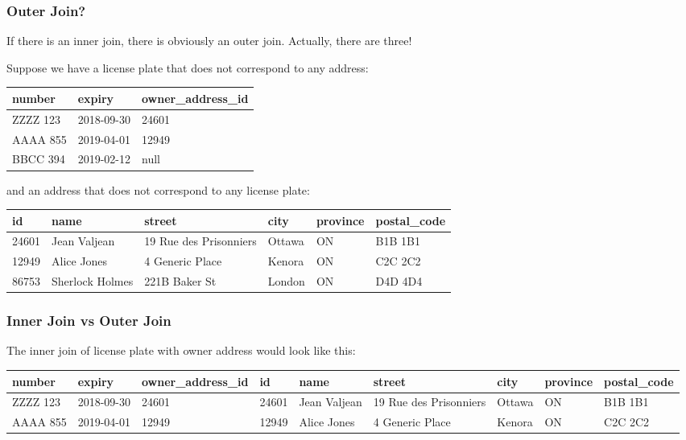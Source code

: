 \begin{frame}
\frametitle{Outer Join?}

If there is an inner join, there is obviously an outer join. Actually, there are three!

Suppose we have a license plate that does not correspond to any address: 

{\scriptsize
\begin{center}
\begin{tabular}{|l|l|l|}\hline
	\textbf{number} & \textbf{expiry} & \textbf{owner\_address\_id} \\ \hline
	ZZZZ 123 & 2018-09-30 & 24601 \\ \hline
	AAAA 855 & 2019-04-01 & 12949 \\ \hline
	BBCC 394 & 2019-02-12 & null \\ \hline
\end{tabular}
\end{center}
}

and an address that does not correspond to any license plate:

{\scriptsize
\begin{center}
	\begin{tabular}{|l|l|l|l|l|l|}\hline
		\textbf{id} & \textbf{name} &\textbf{street} & \textbf{city} & \textbf{province} & \textbf{postal\_code} \\ \hline
		24601 & Jean Valjean & 19 Rue des Prisonniers & Ottawa & ON & B1B 1B1\\ \hline
		12949 & Alice Jones & 4 Generic Place & Kenora & ON & C2C 2C2\\ \hline
		86753 & Sherlock Holmes & 221B Baker St & London & ON & D4D 4D4\\ \hline
	\end{tabular}
\end{center}
}

\end{frame}


\begin{frame}
\frametitle{Inner Join vs Outer Join}

The inner join of license plate with owner address would look like this: 

{\tiny
\begin{center}
	\begin{tabular}{|l|l|l|l|l|l|l|l|l|}\hline
		\textbf{number} & \textbf{expiry} & \textbf{owner\_address\_id} & \textbf{id} & \textbf{name} &\textbf{street} & \textbf{city} & \textbf{province} & \textbf{postal\_code} \\ \hline
		ZZZZ 123 & 2018-09-30 & 24601 & 24601 & Jean Valjean & 19 Rue des Prisonniers & Ottawa & ON & B1B 1B1\\ \hline
		AAAA 855 & 2019-04-01 & 12949 & 12949 & Alice Jones & 4 Generic Place & Kenora & ON & C2C 2C2\\ \hline
	\end{tabular}
\end{center}
}


\end{frame}



